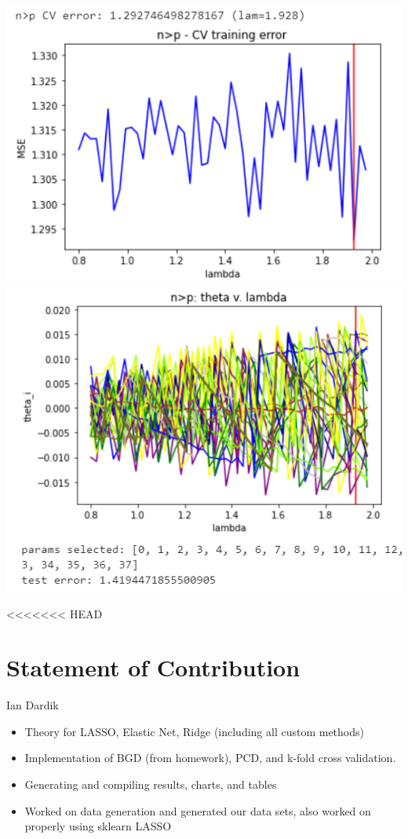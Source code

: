 \documentclass[11pt]{article}
\begin{document}
\begin{center}
\includegraphics[scale=0.7]{charts/bgd_corr_n_gt_p_err.PNG}
\includegraphics[scale=0.7]{charts/bgd_corr_n_gt_p_thetas.PNG}
\end{center}

<<<<<<< HEAD
\section{Statement of Contribution}
Ian Dardik
\begin{itemize}
	\item Theory for LASSO, Elastic Net, Ridge (including all custom methods)
	\item Implementation of BGD (from homework), PCD, and k-fold cross validation.  
	\item Generating and compiling results, charts, and tables
	\item Worked on data generation and generated our data sets, also worked on properly using sklearn LASSO
\end{itemize}
\end{document}
